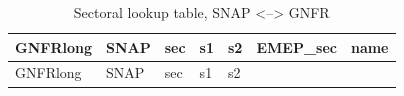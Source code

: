 \documentclass[
]{article}
\begin{document}
\begin{longtable}[]{@{}
  >{\raggedleft\arraybackslash}p{}
  >{\centering\arraybackslash}p{}
  >{\centering\arraybackslash}p{}
  >{\centering\arraybackslash}p{}
  >{\centering\arraybackslash}p{}
  >{\centering\arraybackslash}p{}
  >{\raggedright\arraybackslash}p{}@{}}
\caption{Sectoral lookup table, SNAP \textless--\textgreater{}
GNFR}\tabularnewline
\toprule\noalign{}
\begin{minipage}[b]{\linewidth}\raggedleft
GNFRlong
\end{minipage} & \begin{minipage}[b]{\linewidth}\centering
SNAP
\end{minipage} & \begin{minipage}[b]{\linewidth}\centering
sec
\end{minipage} & \begin{minipage}[b]{\linewidth}\centering
s1
\end{minipage} & \begin{minipage}[b]{\linewidth}\centering
s2
\end{minipage} & \begin{minipage}[b]{\linewidth}\centering
EMEP\_sec
\end{minipage} & \begin{minipage}[b]{\linewidth}\raggedright
name
\end{minipage} \\
\midrule\noalign{}
\endfirsthead
\toprule\noalign{}
\begin{minipage}[b]{\linewidth}\raggedleft
GNFRlong
\end{minipage} & \begin{minipage}[b]{\linewidth}\centering
SNAP
\end{minipage} & \begin{minipage}[b]{\linewidth}\centering
sec
\end{minipage} & \begin{minipage}[b]{\linewidth}\centering
s1
\end{minipage} & \begin{minipage}[b]{\linewidth}\centering
s2
\end{minipage} & \begin{minipage}[b]{\linewidth}\centering

\end{minipage}
\end{longtable}
\end{document}
